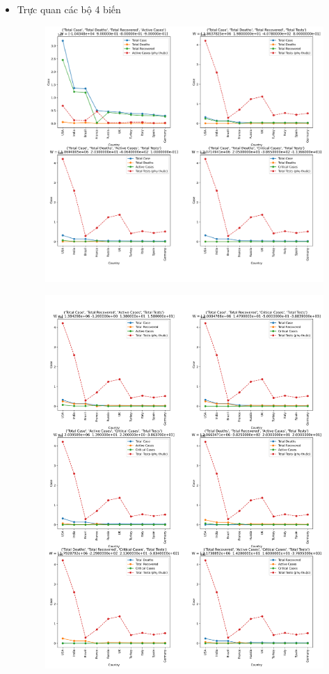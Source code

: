 \documentclass[a4paper, 12pt]{article}
\begin{document}
\begin{itemize}
        \item Trực quan các bộ 4 biến
        \begin{figure}[H]
            \begin{center}
                \includegraphics[scale=0.39]{img/relationship4Vars.png}
            \end{center}
        \end{figure}
        \begin{figure}[H]
            \begin{center}
                \includegraphics[scale=0.39]{img/relationship4Vars_1.png}

\end{center}
\end{figure}
\end{itemize}
\end{document}
